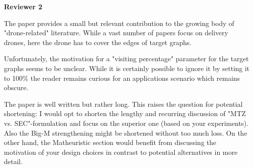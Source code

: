 \documentclass{article}
\newenvironment{reviewer}{\setcounter{pointcounter}{1}}{}
\newcommand{\point}{\text{{\selectfont \thepointcounter} \stepcounter{pointcounter}}}
\begin{document}
\newpage
\begin{reviewer}


\begin{tcolorbox}[breakable,enhanced,coltitle=black,colback=green!75!black,colframe=yellow!75!black,borderline={1pt}{0pt}{black},boxrule=0pt]
\textbf{Reviewer 2}
\end{tcolorbox}


\begin{itshape}
The paper provides a small but relevant contribution to the growing body of "drone-related" literature.
While a vast number of papers focus on delivery drones, here the drone has to cover the edges of target graphs.

Unfortunately, the motivation for a "visiting percentage" parameter for the target graphs seems to be unclear.
While it is certainly possible to ignore it by setting it to 100\% the reader remains curious for an applications scenario which remains obscure.

\end{itshape}


\begin{tcolorbox}[breakable,enhanced,coltitle=black,colback=yellow!5!white,colframe=green!75!black,title=\textbf{Answer R2.\point},borderline={1pt}{0pt}{black},boxrule=0pt]

\end{tcolorbox}


\begin{itshape}
The paper is well written but rather long. This raises the question for potential shortening:
I would opt to shorten the lengthy and recurring discussion of "MTZ vs. SEC"-formulation and focus on the superior one (based on your experiments).
Also the Big-M strengthening might be shortened without too much loss.
On the other hand, the Matheuristic section would benefit from discussing the motivation of your design choices in contrast to potential alternatives in more detail.
\end{itshape}

\begin{tcolorbox}[breakable,enhanced,coltitle=black,colback=yellow!5!white,colframe=green!75!black,title=\textbf{Answer R2.\point},borderline={1pt}{0pt}{black},boxrule=0pt]

\end{tcolorbox}

\end{reviewer}
\end{document}
